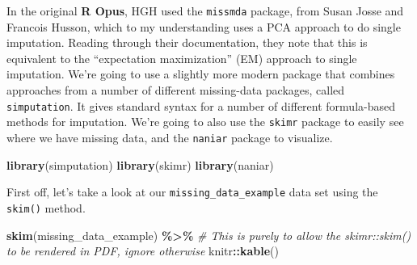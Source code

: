 \documentclass[
]{book}
\newenvironment{Shaded}{\begin{snugshade}}{\end{snugshade}}
\newcommand{\CommentTok}[1]{\textcolor[rgb]{0.56,0.35,0.01}{\textit{#1}}}
\newcommand{\FunctionTok}[1]{\textcolor[rgb]{0.13,0.29,0.53}{\textbf{#1}}}
\newcommand{\NormalTok}[1]{#1}
\newcommand{\SpecialCharTok}[1]{\textcolor[rgb]{0.81,0.36,0.00}{\textbf{#1}}}
\begin{document}
In the original \textbf{R Opus}, HGH used the \texttt{missmda} package, from Susan Josse and Francois Husson, which to my understanding uses a PCA approach to do single imputation. Reading through their documentation, they note that this is equivalent to the ``expectation maximization'' (EM) approach to single imputation. We're going to use a slightly more modern package that combines approaches from a number of different missing-data packages, called \texttt{simputation}. It gives standard syntax for a number of different formula-based methods for imputation. We're going to also use the \texttt{skimr} package to easily see where we have missing data, and the \texttt{naniar} package to visualize.

\begin{Shaded}
\begin{Highlighting}[]
\FunctionTok{library}\NormalTok{(simputation)}
\FunctionTok{library}\NormalTok{(skimr)}
\FunctionTok{library}\NormalTok{(naniar)}
\end{Highlighting}
\end{Shaded}

First off, let's take a look at our \texttt{missing\_data\_example} data set using the \texttt{skim()} method.

\begin{Shaded}
\begin{Highlighting}[]
\FunctionTok{skim}\NormalTok{(missing\_data\_example) }\SpecialCharTok{\%\textgreater{}\%} 
  \CommentTok{\# This is purely to allow the skimr::skim() to be rendered in PDF, ignore otherwise}
\NormalTok{  knitr}\SpecialCharTok{::}\FunctionTok{kable}\NormalTok{()}
\end{Highlighting}
\end{Shaded}
\end{document}
